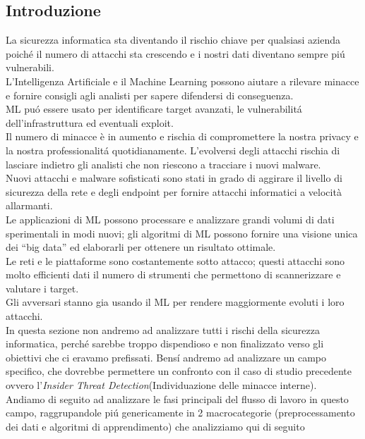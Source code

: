 \documentclass[../tesi.tex]{subfiles}
\begin{document}
\subsection{Introduzione}
La sicurezza informatica sta diventando il rischio chiave per qualsiasi azienda poiché il numero di attacchi sta crescendo e i nostri dati diventano sempre piú vulnerabili.\\
L’Intelligenza Artificiale e il Machine Learning possono aiutare a rilevare minacce e fornire consigli agli analisti per sapere difendersi di conseguenza.\\
ML puó essere usato per identificare target avanzati, le vulnerabilitá dell’infrastruttura ed eventuali exploit.\\
Il numero di minacce è in aumento e rischia di compromettere la nostra privacy e la nostra professionalitá quotidianamente. L’evolversi degli attacchi rischia di lasciare indietro gli analisti che non riescono a tracciare i nuovi malware.\\
Nuovi attacchi e malware sofisticati sono stati in grado di aggirare il livello di sicurezza della rete e degli endpoint per fornire attacchi informatici a velocità allarmanti.\\
Le applicazioni di ML possono processare e analizzare grandi volumi di dati sperimentali in modi nuovi; gli algoritmi di ML possono fornire una visione unica dei “big data” ed elaborarli per ottenere un risultato ottimale.\\
Le reti e le piattaforme sono costantemente sotto attacco; questi attacchi sono molto efficienti dati il numero di strumenti che permettono di scannerizzare e valutare i target.\\
Gli avversari stanno gia usando il ML per rendere maggiormente evoluti i loro attacchi.
\cite{fraley2017promise,bresniker2019grand,MLSecurity}\\
In questa sezione non andremo ad analizzare tutti i rischi della sicurezza informatica, perché sarebbe troppo dispendioso e non finalizzato verso gli obiettivi che ci eravamo prefissati.
Bensí andremo ad analizzare un campo specifico, che dovrebbe permettere un confronto con il caso di studio precedente ovvero l'\textit{Insider Threat Detection}(Individuazione delle minacce interne).\\
Andiamo di seguito ad analizzare le fasi principali del flusso di lavoro in questo campo, raggrupandole piú genericamente in 2 macrocategorie (preprocessamento dei dati e algoritmi di apprendimento) che analizziamo qui di seguito
\end{document}
